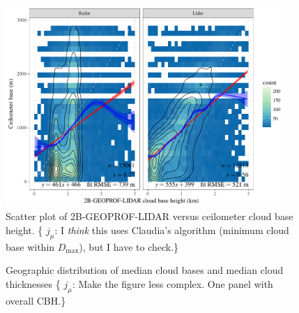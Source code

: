 \documentclass[amt,manuscript]{copernicus}\usepackage[]{graphicx}\usepackage[]{color}
\newcommand{\hlnum}[1]{\textcolor[rgb]{0.686,0.059,0.569}{#1}}%
\newenvironment{knitrout}{}{} %
\newcommand\comment[2]{\{\hlnum{ \textit{#1}: #2}\}}
\newcommand\commentjm[1]{\comment{$j_\mu$}{#1}}
\begin{document}
\begin{figure}
  \centering

\begin{knitrout}
\color{fgcolor}

{\centering \includegraphics[width=0.95\textwidth]{figure/method-eval-2bgeoprof-1} 

}



\end{knitrout}
  \caption{Scatter plot of 2B-GEOPROF-LIDAR versus ceilometer cloud base
    height.  \commentjm{I \textit{think} this uses Claudia's algorithm (minimum
      cloud base within $D_\text{max}$), but I have to check.}}
  \label{fig:eval-2b}
\end{figure}

\begin{figure}
  \centering
  \caption{Geographic distribution of median cloud bases and median cloud
    thicknesses \commentjm{Make the figure less complex.  One panel with overall
    CBH.}}
  \label{fig:geo}
\end{figure}
\end{document}
